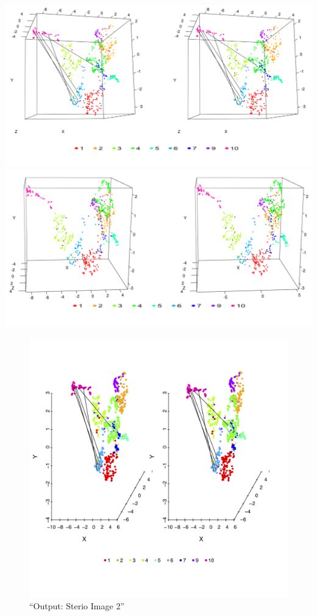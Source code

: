 \documentclass[]{article}
\begin{document}
\includegraphics{../sample.png} \includegraphics{../sample_scatter.png}

\begin{figure}
\centering
\includegraphics{../sample_3D_data_Stereo_net.png}
\caption{``Output: Sterio Image 2''}
\end{figure}
\end{document}
